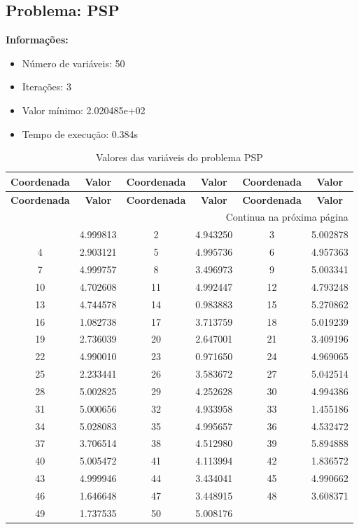 \documentclass[12pt]{article}
\begin{document}
\newpage            
\subsection{Problema: PSP}

\textbf{Informações:}
\begin{itemize}
\item Número de variáveis: 50
\item Iterações: 3
\item Valor mínimo: 2.020485e+02
\item Tempo de execução: 0.384s
\end{itemize}

\small
\begin{longtable}{@{}cc|cc|cc@{}}
\caption{Valores das variáveis do problema PSP} \\
\toprule
\textbf{Coordenada} & \textbf{Valor} & \textbf{Coordenada} & \textbf{Valor} & \textbf{Coordenada} & \textbf{Valor} \\
\midrule
\endfirsthead

\toprule
\textbf{Coordenada} & \textbf{Valor} & \textbf{Coordenada} & \textbf{Valor} & \textbf{Coordenada} & \textbf{Valor} \\
\midrule
\endhead

\midrule \multicolumn{6}{r}{{Continua na próxima página}} \\ \midrule
\endfoot

\bottomrule
\endlastfoot
1 & 4.999813 & 2 & 4.943250 & 3 & 5.002878 \\
4 & 2.903121 & 5 & 4.995736 & 6 & 4.957363 \\
7 & 4.999757 & 8 & 3.496973 & 9 & 5.003341 \\
10 & 4.702608 & 11 & 4.992447 & 12 & 4.793248 \\
13 & 4.744578 & 14 & 0.983883 & 15 & 5.270862 \\
16 & 1.082738 & 17 & 3.713759 & 18 & 5.019239 \\
19 & 2.736039 & 20 & 2.647001 & 21 & 3.409196 \\
22 & 4.990010 & 23 & 0.971650 & 24 & 4.969065 \\
25 & 2.233441 & 26 & 3.583672 & 27 & 5.042514 \\
28 & 5.002825 & 29 & 4.252628 & 30 & 4.994386 \\
31 & 5.000656 & 32 & 4.933958 & 33 & 1.455186 \\
34 & 5.028083 & 35 & 4.995657 & 36 & 4.532472 \\
37 & 3.706514 & 38 & 4.512980 & 39 & 5.894888 \\
40 & 5.005472 & 41 & 4.113994 & 42 & 1.836572 \\
43 & 4.999946 & 44 & 3.434041 & 45 & 4.990662 \\
46 & 1.646648 & 47 & 3.448915 & 48 & 3.608371 \\
49 & 1.737535 & 50 & 5.008176 &  &  \\

\end{longtable}
\end{document}
